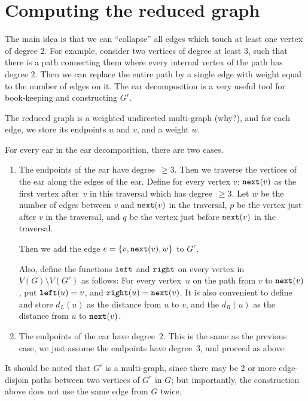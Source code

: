 \section{Computing the reduced graph}
The main idea is that we can ``collapse'' all edges which touch at least
one vertex of degree $2$.
For example, consider two vertices of degree at least $3$, such that there
is a path connecting them where every internal vertex of the path has
degree $2$. Then we can replace the entire path by a single edge with weight
equal to the number of edges on it.
The ear decomposition is a very useful tool for book-keeping and constructing
$G^r$.

The reduced graph is a weighted undirected multi-graph (why?), and for each
edge, we store its endpoints $u$ and $v$, and a weight $w$.

For every ear in the ear decomposition, there are two cases.
\begin{enumerate}[I]
	\item
		The endpoints of the ear have degree~$\geq 3$. Then we traverse the
		vertices of the ear along the edges of the ear. 
		Define for every vertex $v$: $\texttt{next}(v)$ as the first vertex
		after~$v$ in this traversal which has degree~$\geq 3$.
		Let $w$ be the number of edges between $v$ and $\texttt{next}(v)$ in
		the traversal, $p$ be the vertex just after $v$ in the traversal,
		and $q$ be the vertex just before $\texttt{next}(v)$ in the traversal.

		Then we add the edge $e = \left\{ v, \texttt{next}(v), w \right\}$
		to $G^r$.

		Also, define the functions $\texttt{left}$ and $\texttt{right}$ on
		every vertex in $V(G) \setminus V(G^r)$ as follows:
		For every vertex~$u$ on the path from $v$ to $\texttt{next}(v)$,
		put $\texttt{left}(u) = v$, and $\texttt{right}(u) = \texttt{next}(v)$.
		It is also convenient to define and store $d_L(u)$ as the distance
		from $u$ to $v$, and the $d_R(u)$ as the distance from $u$ to
		$\texttt{next}(v)$.
	\item
		The endpoints of the ear have degree~$2$.  This is the same as
		the previous case, we just assume the endpoints have degree~$3$,
		and proceed as above.
\end{enumerate}

It should be noted that $G^r$ is a multi-graph, since there may be 2 or more
edge-disjoin paths between two vertices of $G^r$ in $G$;
but importantly, the construction above does not use the same edge from $G$
twice.

